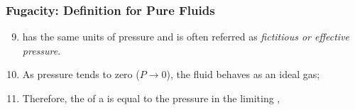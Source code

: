 \documentclass[10pt,compress,handout,ignorenonframetext,unknownkeysallowed]{beamer}
\begin{document}
\begin{frame}
  \frametitle{Fugacity: Definition for Pure Fluids}
        \begin{enumerate}\setcounter{enumi}{8}  
           \item<1->  has the same units of pressure and is often referred as {\it fictitious or effective pressure}.
           \item<2-> As pressure tends to zero ($P\rightarrow 0$), the fluid behaves as an ideal gas; 
           \item<3-> Therefore, the  of a  is equal to the pressure in the limiting , \ie
        \end{enumerate}
\end{frame}
\normalsize
\end{document}

